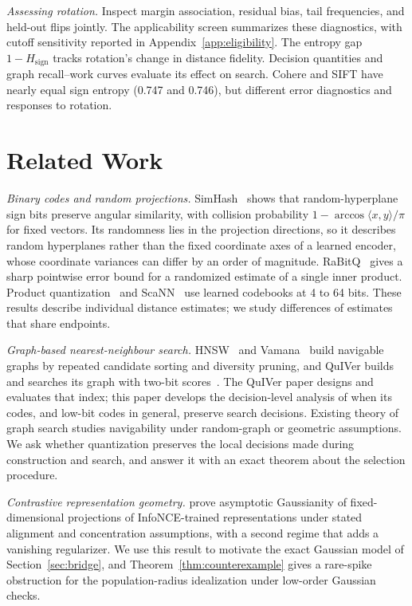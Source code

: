 \documentclass[twoside,11pt]{article}
\begin{document}
\noindent\emph{Assessing rotation.}\quad
Inspect margin association, residual bias, tail frequencies, and held-out flips jointly. The applicability screen summarizes these diagnostics, with cutoff sensitivity reported in Appendix~\ref{app:eligibility}. The entropy gap $1-H_{\mathrm{sign}}$ tracks rotation's change in distance fidelity. Decision quantities and graph recall--work curves evaluate its effect on search. Cohere and SIFT have nearly equal sign entropy (0.747 and 0.746), but different error diagnostics and responses to rotation.

\section{Related Work}
\label{sec:related}

\noindent\emph{Binary codes and random projections.}\quad
SimHash~\citep{charikar2002similarity} shows that random-hyperplane sign bits preserve angular similarity, with collision probability $1-\arccos\langle x,y\rangle/\pi$ for fixed vectors. Its randomness lies in the projection directions, so it describes random hyperplanes rather than the fixed coordinate axes of a learned encoder, whose coordinate variances can differ by an order of magnitude. RaBitQ~\citep{gao2023rabitq} gives a sharp pointwise error bound for a randomized estimate of a single inner product. Product quantization~\citep{jegou2011product,ge2014optimized} and ScaNN~\citep{guo2020accelerating} use learned codebooks at 4 to 64 bits. These results describe individual distance estimates; we study differences of estimates that share endpoints.

\noindent\emph{Graph-based nearest-neighbour search.}\quad
HNSW~\citep{malkov2020efficient} and Vamana~\citep{subramanya2019diskann} build navigable graphs by repeated candidate sorting and diversity pruning, and QuIVer builds and searches its graph with two-bit scores~\citep{xiao2026quiver}. The QuIVer paper designs and evaluates that index; this paper develops the decision-level analysis of when its codes, and low-bit codes in general, preserve search decisions. Existing theory of graph search studies navigability under random-graph or geometric assumptions. We ask whether quantization preserves the local decisions made during construction and search, and answer it with an exact theorem about the selection procedure.

\noindent\emph{Contrastive representation geometry.}\quad
\citet{betser2026infonce} prove asymptotic Gaussianity of fixed-dimensional projections of InfoNCE-trained representations under stated alignment and concentration assumptions, with a second regime that adds a vanishing regularizer. We use this result to motivate the exact Gaussian model of Section~\ref{sec:bridge}, and Theorem~\ref{thm:counterexample} gives a rare-spike obstruction for the population-radius idealization under low-order Gaussian checks.
\end{document}
